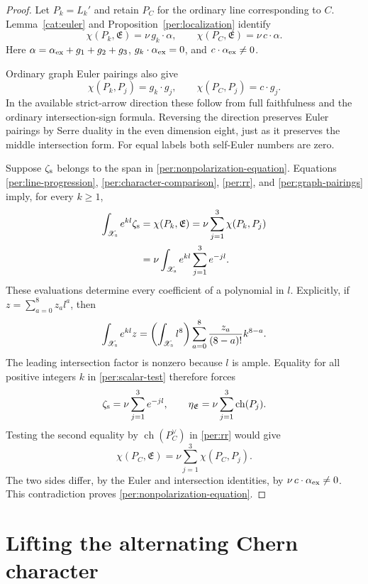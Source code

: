 \documentclass[11pt]{article}
\theoremstyle{definition}
\theoremstyle{remark}
\numberwithin{equation}{section}
\begin{document}
\begin{proof}
Let $P_k=L_k'$ and retain $P_C$ for the ordinary line corresponding
to $C$.  Lemma~\ref{cat:euler} and
Proposition~\ref{per:localization} identify
\[
 \chi(P_k,\mathfrak E)=\nu\,g_k\cdot\alpha,
 \qquad
 \chi(P_C,\mathfrak E)=\nu\,c\cdot\alpha.
\]
Here $\alpha=\alpha_{\rm ex}+g_1+g_2+g_3$,
$g_k\cdot\alpha_{\rm ex}=0$, and
$c\cdot\alpha_{\rm ex}\ne0$.

Ordinary graph Euler pairings also give
\begin{equation}
 \chi(P_k,P_j)=g_k\cdot g_j,
 \qquad
 \chi(P_C,P_j)=c\cdot g_j.
 \label{per:graph-pairings}
\end{equation}
In the available strict-arrow direction these follow from full
faithfulness and the ordinary intersection-sign formula.  Reversing
the direction preserves Euler pairings by Serre duality in the even
dimension eight, just as it preserves the middle intersection form.
For equal labels both self-Euler numbers are zero.

Suppose $\zeta_{\rm s}$ belongs to the span in
\eqref{per:nonpolarization-equation}.  Equations
\eqref{per:line-progression}, \eqref{per:character-comparison},
\eqref{per:rr}, and \eqref{per:graph-pairings} imply, for every
$k\ge1$,
\begin{align}
 \int_{\mathscr X_{\rm s}}e^{kl}\zeta_{\rm s}
   &=\chi(P_k,\mathfrak E)
     =\nu\sum_{j=1}^3\chi(P_k,P_j)\notag\\
   &=\nu\int_{\mathscr X_{\rm s}}
                         e^{kl}\sum_{j=1}^3e^{-jl}.
 \label{per:scalar-test}
\end{align}
These evaluations determine every coefficient of a polynomial in
$l$.  Explicitly, if $z=\sum_{a=0}^8z_al^a$, then
\[
 \int_{\mathscr X_{\rm s}}e^{kl}z
    =\left(\int_{\mathscr X_{\rm s}}l^8\right)
       \sum_{a=0}^8\frac{z_a}{(8-a)!}k^{8-a}.
\]
The leading intersection factor is nonzero because $l$ is ample.
Equality for all positive integers $k$ in \eqref{per:scalar-test}
therefore forces
\[
 \zeta_{\rm s}=\nu\sum_{j=1}^3e^{-jl},
 \qquad
 \eta_{\mathfrak E}=\nu\sum_{j=1}^3\operatorname{ch}(P_j).
\]
Testing the second equality by $\operatorname{ch}(P_C^\vee)$ in
\eqref{per:rr} would give
\[
 \chi(P_C,\mathfrak E)=\nu\sum_{j=1}^3\chi(P_C,P_j).
\]
The two sides differ, by the Euler and intersection identities,
by $\nu\,c\cdot\alpha_{\rm ex}\ne0$.  This contradiction proves
\eqref{per:nonpolarization-equation}.
\end{proof}

\section{Lifting the alternating Chern character}
\label{lift:section}
\end{document}
